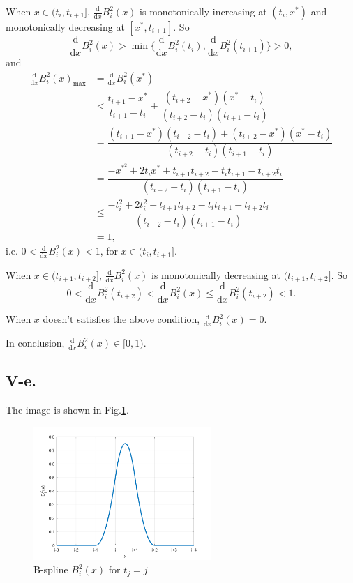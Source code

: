 \documentclass[a4paper]{article}
\begin{document}
When $x\in (t_{i},t_{i+1}]$, $\frac{\mathrm{d}}{\mathrm{d}x}B_i^2(x)$ is monotonically increasing at $(t_i,x^{*})$ and monotonically decreasing at $[x^{*},t_{i+1}]$. So 
$$\frac{\mathrm{d}}{\mathrm{d}x}B_i^2(x)>\min\{\frac{\mathrm{d}}{\mathrm{d}x}B_i^2(t_{i}),\frac{\mathrm{d}}{\mathrm{d}x}B_i^2(t_{i+1})\}>0,$$
and 
$$
\begin{aligned}
  \frac{\mathrm{d}}{\mathrm{d}x}B_i^2(x)_{\mathrm{max}}&=\frac{\mathrm{d}}{\mathrm{d}x}B_i^2(x^{*})\\
  &<\dfrac{t_{i+1}-x^{*}}{t_{i+1}-t_{i}}+\dfrac{(t_{i+2}-x^{*})(x^{*}-t_i)}{(t_{i+2}-t_i)(t_{i+1}-t_i)}\\
  &=\dfrac{(t_{i+1}-x^{*})(t_{i+2}-t_i)+(t_{i+2}-x^{*})(x^{*}-t_i)}{(t_{i+2}-t_i)(t_{i+1}-t_i)}\\
  &=\dfrac{-x^{*^2}+2t_{i}x^{*}+t_{i+1}t_{i+2}-t_{i}t_{i+1}-t_{i+2}t_{i}}{(t_{i+2}-t_i)(t_{i+1}-t_i)}\\
  &\leq\dfrac{-t_{i}^2+2t_{i}^2+t_{i+1}t_{i+2}-t_{i}t_{i+1}-t_{i+2}t_{i}}{(t_{i+2}-t_i)(t_{i+1}-t_i)}\\
  &=1,
\end{aligned}
$$
i.e. $0<\frac{\mathrm{d}}{\mathrm{d}x}B_i^2(x)<1$, for $x\in(t_{i},t_{i+1}]$.

When $x\in (t_{i+1},t_{i+2}]$, $\frac{\mathrm{d}}{\mathrm{d}x}B_i^2(x)$ is monotonically decreasing at $(t_{i+1},t_{i+2}]$. So 
$$
0<\frac{\mathrm{d}}{\mathrm{d}x}B_i^2(t_{i+2})<\frac{\mathrm{d}}{\mathrm{d}x}B_i^2(x)\leq \frac{\mathrm{d}}{\mathrm{d}x}B_i^2(t_{i+2})<1.
$$

When $x$ doesn't satisfies the above condition, $\frac{\mathrm{d}}{\mathrm{d}x}B_i^2(x)=0$.

In conclusion, $\frac{\mathrm{d}}{\mathrm{d}x}B_i^2(x)\in[0,1)$.


\subsection*{V-e.}
The image is shown in Fig.\ref{fig1}.

\begin{figure}[H]
  \centering
  \includegraphics[width=0.6\textwidth]{./images/B_i^2.png}
  \renewcommand{\figurename}{Fig.}
  \caption{B-spline $B^2_i(x)$ for $t_j = j$}
  \label{fig1}
\end{figure}
\end{document}
